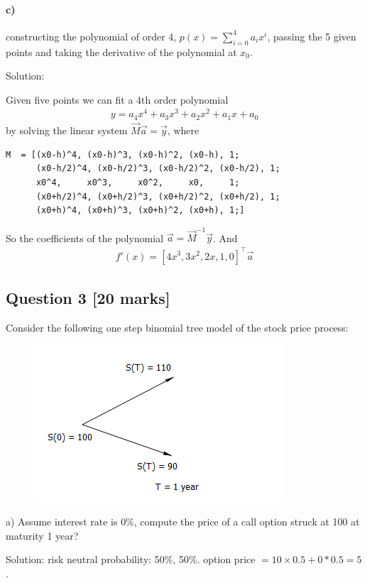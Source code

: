 \documentclass[11pt,a4paper,hidelinks,fleqn]{article}            %
\begin{document}
\paragraph{c)} constructing the polynomial of order 4, $p(x) = \sum_{i=0}^4 a_i x^i$, passing the 5 given points and taking the derivative of the polynomial at $x_0$.

Solution:

Given five points we can fit a 4th order polynomial 
\begin{align*}
y = a_4 x^4 + a_3 x^3 + a_2 x^2 + a_1 x + a_0
\end{align*}
by solving the linear system $\vec{M} \vec{a} = \vec{y}$, where
\begin{verbatim}
M  = [(x0-h)^4, (x0-h)^3, (x0-h)^2, (x0-h), 1;
      (x0-h/2)^4, (x0-h/2)^3, (x0-h/2)^2, (x0-h/2), 1;
      x0^4, 	x0^3, 	  x0^2,     x0,     1;
      (x0+h/2)^4, (x0+h/2)^3, (x0+h/2)^2, (x0+h/2), 1;
      (x0+h)^4, (x0+h)^3, (x0+h)^2, (x0+h), 1;]
\end{verbatim}
So the coefficients of the polynomial $\vec{a} = \vec{M}^{-1} \vec{y}$.
And 
\begin{align*}
f'(x) = [4x^3, 3x^2, 2x, 1, 0]^\top \vec{a}
\end{align*}



\subsection*{Question 3 [20 marks]}
Consider the following one step binomial tree model of the stock price process:
\begin{figure}[h]
\includegraphics[scale=0.9]{./4}
\end{figure}

a) Assume interest rate is $0\%$, compute the price of a call option struck at 100 at maturity 1 year?

Solution: risk neutral probability: 50\%, 50\%. option price $= 10 \times 0.5 + 0 * 0.5 = 5$.
\end{document}
